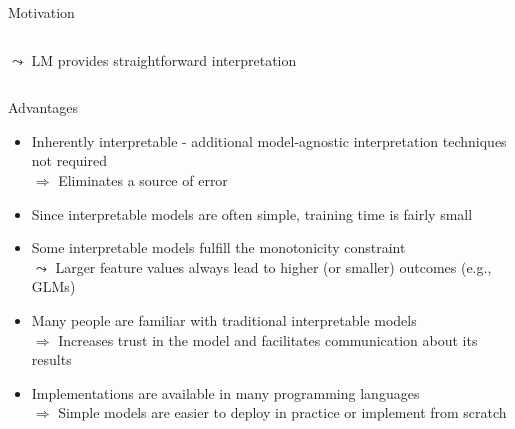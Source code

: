 \documentclass[11pt,compress,t,notes=noshow, aspectratio=169, xcolor=table]{beamer}
\begin{document}
\begin{frame}{Motivation}
\begin{columns}[T, totalwidth = \linewidth]
\begin{column}{0.45\textwidth}
  \begin{center}
    $\leadsto$ LM provides straightforward interpretation
  \end{center}
    \end{column}
\end{columns}
\end{frame}

\begin{frame}{Advantages}

    \begin{itemize}[<+->]
    \itemsep1em
        \item Inherently interpretable - additional model-agnostic interpretation techniques not required \\
        $\Rightarrow$ Eliminates a source of error
        \item Since interpretable models are often simple, training time is fairly small
        \item Some interpretable models fulfill the monotonicity constraint \\
        $\leadsto$ Larger feature values always lead to higher (or smaller) outcomes (e.g., GLMs)
        \item Many people are familiar with traditional interpretable models \\
        $\Rightarrow$ Increases trust in the model and facilitates communication about its results
        \item Implementations are available in many programming languages \\
        $\Rightarrow$ Simple models are easier to deploy in practice or implement from scratch
    \end{itemize}

\end{frame}
\end{document}
